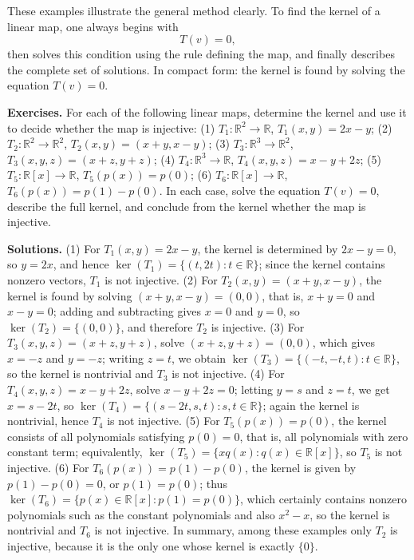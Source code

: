 \documentclass[12pt]{article}
\begin{document}
	These examples illustrate the general method clearly. To find the kernel of a linear map, one always begins with
	\[
	T(v)=0,
	\]
	then solves this condition using the rule defining the map, and finally describes the complete set of solutions. In compact form: the kernel is found by solving the equation \(T(v)=0\).
	
	\textbf{Exercises.} For each of the following linear maps, determine the kernel and use it to decide whether the map is injective: (1) \(T_1:\mathbb{R}^2\to\mathbb{R}\), \(T_1(x,y)=2x-y\); (2) \(T_2:\mathbb{R}^2\to\mathbb{R}^2\), \(T_2(x,y)=(x+y,x-y)\); (3) \(T_3:\mathbb{R}^3\to\mathbb{R}^2\), \(T_3(x,y,z)=(x+z,y+z)\); (4) \(T_4:\mathbb{R}^3\to\mathbb{R}\), \(T_4(x,y,z)=x-y+2z\); (5) \(T_5:\mathbb{R}[x]\to\mathbb{R}\), \(T_5(p(x))=p(0)\); (6) \(T_6:\mathbb{R}[x]\to\mathbb{R}\), \(T_6(p(x))=p(1)-p(0)\). In each case, solve the equation \(T(v)=0\), describe the full kernel, and conclude from the kernel whether the map is injective.
	
	\textbf{Solutions.} (1) For \(T_1(x,y)=2x-y\), the kernel is determined by \(2x-y=0\), so \(y=2x\), and hence \(\ker(T_1)=\{(t,2t):t\in\mathbb{R}\}\); since the kernel contains nonzero vectors, \(T_1\) is not injective. (2) For \(T_2(x,y)=(x+y,x-y)\), the kernel is found by solving \((x+y,x-y)=(0,0)\), that is, \(x+y=0\) and \(x-y=0\); adding and subtracting gives \(x=0\) and \(y=0\), so \(\ker(T_2)=\{(0,0)\}\), and therefore \(T_2\) is injective. (3) For \(T_3(x,y,z)=(x+z,y+z)\), solve \((x+z,y+z)=(0,0)\), which gives \(x=-z\) and \(y=-z\); writing \(z=t\), we obtain \(\ker(T_3)=\{(-t,-t,t):t\in\mathbb{R}\}\), so the kernel is nontrivial and \(T_3\) is not injective. (4) For \(T_4(x,y,z)=x-y+2z\), solve \(x-y+2z=0\); letting \(y=s\) and \(z=t\), we get \(x=s-2t\), so \(\ker(T_4)=\{(s-2t,s,t):s,t\in\mathbb{R}\}\); again the kernel is nontrivial, hence \(T_4\) is not injective. (5) For \(T_5(p(x))=p(0)\), the kernel consists of all polynomials satisfying \(p(0)=0\), that is, all polynomials with zero constant term; equivalently, \(\ker(T_5)=\{xq(x):q(x)\in\mathbb{R}[x]\}\), so \(T_5\) is not injective. (6) For \(T_6(p(x))=p(1)-p(0)\), the kernel is given by \(p(1)-p(0)=0\), or \(p(1)=p(0)\); thus \(\ker(T_6)=\{p(x)\in\mathbb{R}[x]:p(1)=p(0)\}\), which certainly contains nonzero polynomials such as the constant polynomials and also \(x^2-x\), so the kernel is nontrivial and \(T_6\) is not injective. In summary, among these examples only \(T_2\) is injective, because it is the only one whose kernel is exactly \(\{0\}\).
\end{document}

